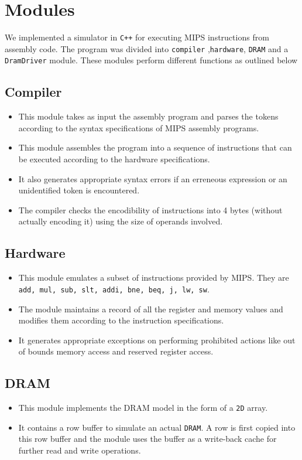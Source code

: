 \documentclass[hidelinks,12pt]{article}
\begin{document}
\section{Modules}
We implemented a simulator in \verb|C++| for executing MIPS instructions from assembly code. The program was divided into \verb|compiler| ,\verb|hardware|, \verb|DRAM| and a \verb|DramDriver| module.
These modules perform different functions as outlined below
\subsection{Compiler}
\begin{itemize}
    \item This module takes as input the assembly program and parses the tokens according to the syntax specifications of MIPS assembly programs.
    \item This module assembles the program into a sequence of instructions that can be executed according to the hardware specifications.
    \item It also generates appropriate syntax errors if an erreneous expression or an unidentified token is encountered.
    \item The compiler checks the encodibility of instructions into 4 bytes (without actually encoding it) using the size of operands involved.
\end{itemize}
\subsection{Hardware}
\begin{itemize}
    \item This module emulates a subset of instructions provided by MIPS. They are \verb|add, mul, sub, slt, addi, bne, beq, j, lw, sw|.
    \item The module maintains a record of all the register and memory values and modifies them according to the instruction specifications.
    \item It generates appropriate exceptions on performing prohibited actions like out of bounds memory access and reserved register access.
\end{itemize}

\subsection{DRAM}
\begin{itemize}
    \item This module implements the DRAM model in the form of a \verb|2D| array.
    \item It contains a row buffer to simulate an actual \verb|DRAM|. A row is first copied into this row buffer and the module uses the buffer as a write-back cache for further read and write operations.
\end{itemize}
\end{document}
